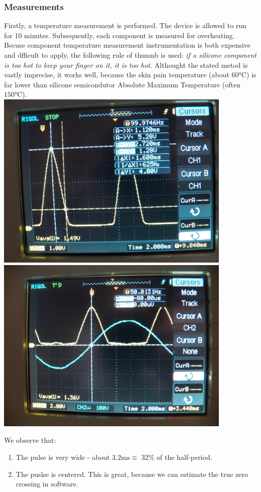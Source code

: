 \subsubsection{Measurements}
Firstly, a temperature measurement is performed.
The device is allowed to run for 10 minutes.
Subsequently, each component is measured for overheating.
Becuse component temperature measurement instrumentation is both expensive and dfficult to apply, the following rule of thunmb is used:
\textit{if a silicone component is too hot to keep your finger on it, it is too hot}.
Althought the stated metod is vastly imprecise, it works well, because the skin pain temperature (about $60\si{\celsius}$) is far lower than silicone semicondutor Absolute Maximum Temperature (often $150\si{\celsius}$).
\\
\includegraphics[width=0.85\textwidth]{../images/ZCD_scope1}~
\\
\includegraphics[width=0.85\textwidth]{../images/ZCD_scope2}~
\par
We observe that:
\begin{enumerate}
\item{The pulse is very wide - about $3.2\si{\milli\second} \equiv$ 32\% of the half-period.}
\item{The puslse is centered. This is great, because we can estimate the true zero crossing in software.}
\end{enumerate}

